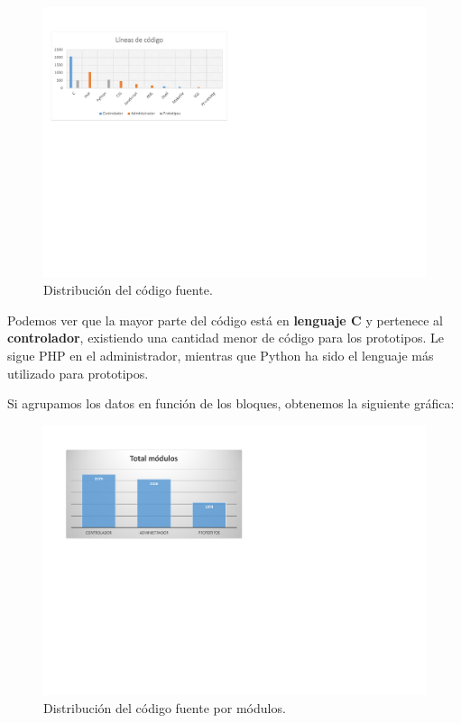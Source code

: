 \begin{figure}[H]
	\noindent \begin{centering}
		\includegraphics[clip=true,trim=10 340 410 50,width=\linewidth*3/4]{capitulo5/lineas}
		\par\end{centering}
	\smallskip
	\caption{\label{fig:lineas} Distribución del código fuente.}
\end{figure} 

\smallskip

Podemos ver que la mayor parte del código está en \textbf{lenguaje C} y pertenece al \textbf{controlador}, existiendo una cantidad menor de código para los prototipos. Le sigue \acrshort{PHP} en el administrador, mientras que Python ha sido el lenguaje más utilizado para prototipos.

Si agrupamos los datos en función de los bloques, obtenemos la siguiente gráfica:

\smallskip

\begin{figure}[H]
	\noindent \begin{centering}
		\includegraphics[clip=true,trim=10 340 410 50,width=\linewidth*3/4]{capitulo5/lineas_modulos}
		\par\end{centering}
	\smallskip
	\caption{\label{fig:lineas_modulos} Distribución del código fuente por módulos.}
\end{figure} 

